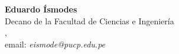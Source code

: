 \begin{center}
\textbf{Eduardo Ísmodes}\\
Decano de la Facultad de Ciencias e Ingenierí­a\\
\institution, \city\\
email: \textit{eismode@pucp.edu.pe}
\end{center}


